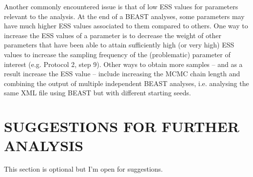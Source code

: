 \documentclass{article}
\begin{document}
\begin{multicols}{2}
Another commonly encountered issue is that of low ESS values for parameters relevant to the analysis. At the end of a BEAST analyses, some parameters may have much higher ESS values associated to them compared to others. One way to increase the ESS values of a parameter is to decrease the weight of other parameters that have been able to attain sufficiently high (or very high) ESS values to increase the sampling frequency of the (problematic) parameter of interest (e.g. Protocol 2, step 9). Other ways to obtain more samples -- and as a result increase the ESS value -- include increasing the MCMC chain length and combining the output of multiple independent BEAST analyses, i.e. analysing the same XML file using BEAST but with different starting seeds.

\section*{SUGGESTIONS FOR FURTHER ANALYSIS}

This section is optional but I'm open for suggestions.




\end{multicols}
\end{document}
